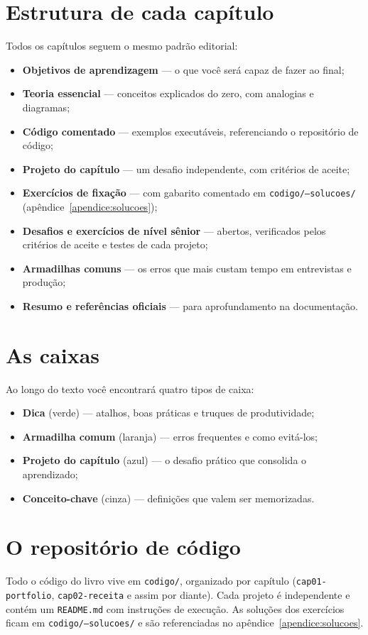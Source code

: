 \section*{Estrutura de cada capítulo}
Todos os capítulos seguem o mesmo padrão editorial:
\begin{itemize}[leftmargin=*, itemsep=0.3em]
  \item \textbf{Objetivos de aprendizagem} — o que você será capaz de fazer ao final;
  \item \textbf{Teoria essencial} — conceitos explicados do zero, com analogias e diagramas;
  \item \textbf{Código comentado} — exemplos executáveis, referenciando o repositório de código;
  \item \textbf{Projeto do capítulo} — um desafio independente, com critérios de aceite;
  \item \textbf{Exercícios de fixação} — com gabarito comentado em
  \texttt{codigo/--solucoes/} (apêndice~\ref{apendice:solucoes});
  \item \textbf{Desafios e exercícios de nível sênior} — abertos, verificados
  pelos critérios de aceite e testes de cada projeto;
  \item \textbf{Armadilhas comuns} — os erros que mais custam tempo em entrevistas e produção;
  \item \textbf{Resumo e referências oficiais} — para aprofundamento na documentação.
\end{itemize}

\section*{As caixas}
Ao longo do texto você encontrará quatro tipos de caixa:
\begin{itemize}[leftmargin=*, itemsep=0.3em]
  \item \textbf{Dica} (verde) — atalhos, boas práticas e truques de produtividade;
  \item \textbf{Armadilha comum} (laranja) — erros frequentes e como evitá-los;
  \item \textbf{Projeto do capítulo} (azul) — o desafio prático que consolida o aprendizado;
  \item \textbf{Conceito-chave} (cinza) — definições que valem ser memorizadas.
\end{itemize}

\section*{O repositório de código}
Todo o código do livro vive em \texttt{codigo/}, organizado por capítulo
(\texttt{cap01-portfolio}, \texttt{cap02-receita} e assim por diante). Cada
projeto é independente e contém um \texttt{README.md} com instruções de
execução. As soluções dos exercícios ficam em \texttt{codigo/--solucoes/} e são
referenciadas no apêndice~\ref{apendice:solucoes}.

